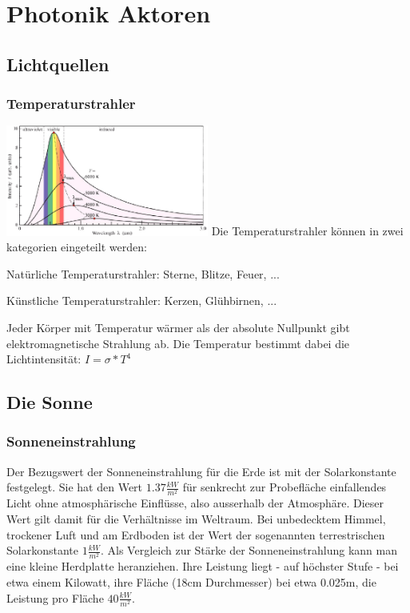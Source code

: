 \section{Photonik Aktoren}
\subsection{Lichtquellen}
\subsubsection{Temperaturstrahler}
\begin{multicols}{2}
    \includegraphics[width=0.5\textwidth]{images/temperaturstrahler} \vfill \columnbreak
    Die Temperaturstrahler können in zwei kategorien eingeteilt werden:
    \begin{compactitem}
        \item Natürliche Temperaturstrahler: Sterne, Blitze, Feuer, ...
        \item Künstliche Temperaturstrahler: Kerzen, Glühbirnen, ... 
    \end{compactitem}
    Jeder Körper mit Temperatur wärmer als der absolute Nullpunkt gibt elektromagnetische Strahlung ab.
    Die Temperatur bestimmt dabei die Lichtintensität: $I=\sigma*T^4$
\end{multicols}

\subsection{Die Sonne}
\subsubsection{Sonneneinstrahlung}
Der Bezugswert der Sonneneinstrahlung für die Erde ist mit der Solarkonstante festgelegt. Sie hat den Wert $1.37 \frac{kW}{m^2}$ für senkrecht zur Probefläche einfallendes Licht ohne atmosphärische Einflüsse, also ausserhalb der Atmosphäre. Dieser Wert gilt damit für die Verhältnisse im Weltraum. Bei unbedecktem Himmel, trockener Luft und am Erdboden ist der Wert der sogenannten terrestrischen Solarkonstante $1 \frac{kW}{m^2}$. Als Vergleich zur Stärke der Sonneneinstrahlung kann man eine kleine Herdplatte heranziehen. Ihre Leistung liegt - auf höchster Stufe - bei etwa einem Kilowatt, ihre Fläche (18cm Durchmesser) bei etwa 0.025m, die Leistung pro Fläche $40 \frac{kW}{m^2}$.


